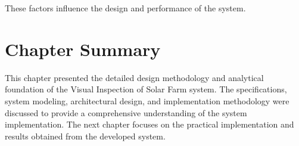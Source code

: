 These factors influence the design and performance of the system.

\section{Chapter Summary}

This chapter presented the detailed design methodology and analytical foundation of the Visual Inspection of Solar Farm system. The specifications, system modeling, architectural design, and implementation methodology were discussed to provide a comprehensive understanding of the system implementation. The next chapter focuses on the practical implementation and results obtained from the developed system.

